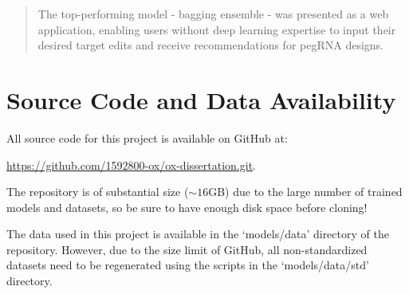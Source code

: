 \documentclass[a4paper,nobind]{ociamthesis}
\newcommand*{\bibtitle}{References}
\begin{document}
\begin{romanpages}
\begin{abstract}
    The top-performing model - bagging ensemble - was presented as a web application, enabling users without deep learning expertise to input their desired target edits and receive recommendations for pegRNA designs.
\end{abstract}

\dominitoc %

\flushbottom

\tableofcontents

\listoffigures
\mtcaddchapter


\chapter*{Source Code and Data Availability}
All source code for this project is available on GitHub at:

\url{https://github.com/1592800-ox/ox-dissertation.git}. 

The repository is of substantial size ($\sim 16$GB) due to the large number of trained models and datasets, so be sure to have enough disk space before cloning!

The data used in this project is available in the `models/data' directory of the repository. However, due to the size limit of GitHub, all non-standardized datasets need to be regenerated using the scripts in the `models/data/std' directory.


\end{romanpages}






\startappendices




{\renewcommand*\MakeUppercase[1]{#1}%

% 



\printbibliography[heading=bibintoc,title={\bibtitle}]}
\end{document}
